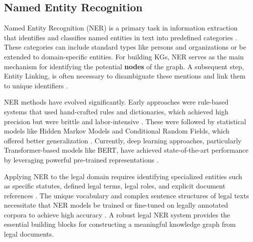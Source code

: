\subsection{Named Entity Recognition}
Named Entity Recognition (NER) is a primary task in information extraction that identifies and classifies named entities in text into predefined categories \parencite{RefWorks:RefID:4-al-moslmi2020named}. These categories can include standard types like persons and organizations or be extended to domain-specific entities. For building KGs, NER serves as the main mechanism for identifying the potential \textbf{nodes} of the graph. A subsequent step, Entity Linking, is often necessary to disambiguate these mentions and link them to unique identifiers \parencite{RefWorks:RefID:5-chaurasiya2022entity}.

NER methods have evolved significantly. Early approaches were rule-based systems that used hand-crafted rules and dictionaries, which achieved high precision but were brittle and labor-intensive \parencite{RefWorks:RefID:126-nadeau2007survey, RefWorks:RefID:127-grishman1996messageunderstanding}. These were followed by statistical models like Hidden Markov Models and Conditional Random Fields, which offered better generalization \parencite{RefWorks:RefID:128-lafferty2001conditional}. Currently, deep learning approaches, particularly Transformer-based models like BERT, have achieved state-of-the-art performance by leveraging powerful pre-trained representations \parencite{RefWorks:RefID:4-al-moslmi2020named, RefWorks:RefID:57-carbonell2020named}.

Applying NER to the legal domain requires identifying specialized entities such as specific statutes, defined legal terms, legal roles, and explicit document references \parencite{RefWorks:RefID:124-au2022ener, RefWorks:RefID:125-kalamkar2022named}. The unique vocabulary and complex sentence structures of legal texts necessitate that NER models be trained or fine-tuned on legally annotated corpora to achieve high accuracy \parencite{RefWorks:RefID:64-2022lexglue}. A robust legal NER system provides the essential building blocks for constructing a meaningful knowledge graph from legal documents.

